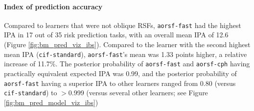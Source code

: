 \documentclass[12pt]{article}\usepackage[]{graphicx}\usepackage[]{xcolor}
\begin{document}
\paragraph{Index of prediction accuracy}

Compared to learners that were not oblique RSFs, \texttt{aorsf-fast} had the highest IPA in 17 out of 35 risk prediction tasks, with an overall mean IPA of 12.6 (Figure \ref{fig:bm_pred_viz_ibs}). Compared to the learner with the second highest mean IPA (\texttt{cif-standard}), \texttt{aorsf-fast}'s mean was 1.33 points higher, a relative increase of 11.7\%. The posterior probability of \texttt{aorsf-fast} and \texttt{aorsf-cph} having practically equivalent expected IPA was 0.99, and the posterior probability of \texttt{aorsf-fast} having a superior IPA to other learners ranged from 0.80 (versus \texttt{cif-standard}) to $>$0.999 (versus several other learners; see Figure \ref{fig:bm_pred_model_viz_ibs})
\end{document}
